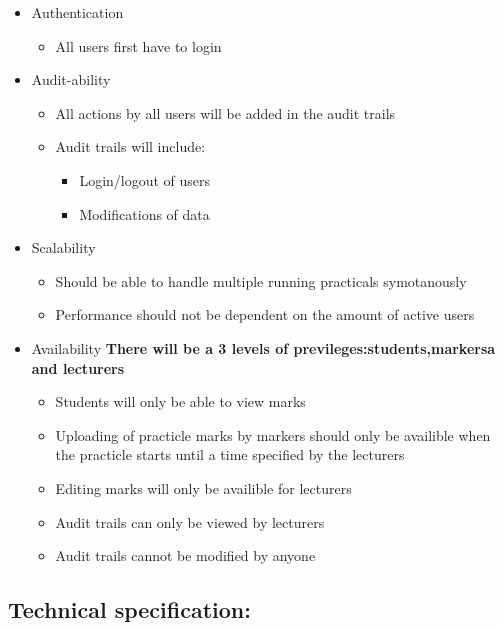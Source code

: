 \documentclass[12pt]{article}
\begin{document}
		\begin{itemize}
			\item Authentication
				\begin{itemize}
					\item All users first have to login
				\end{itemize}
			\item Audit-ability
				\begin{itemize}
					\item All actions by all users will be added in the audit trails
					\item Audit trails will include:
					\begin{itemize}
						\item Login/logout of users
						\item Modifications of data
					\end{itemize}
				\end{itemize}
			\item Scalability
				\begin{itemize}
					\item Should be able to handle multiple running practicals symotanously
					\item Performance should not be dependent on the amount of active users
				\end{itemize}
			\item Availability
				\textbf{There will be a 3 levels of previleges:students,markersa and lecturers}
				\begin{itemize}
					\item Students will only be able to view marks
					\item Uploading of practicle marks by markers should only be availible when the practicle starts until a time specified by the lecturers
					\item Editing marks will only be availible for lecturers
					\item Audit trails can only be viewed by lecturers
					\item Audit trails cannot be modified by anyone
				\end{itemize}
		\end{itemize}
				
		\subsection{Technical specification:} %
		\vspace{0.1in}
		
\end{document}
